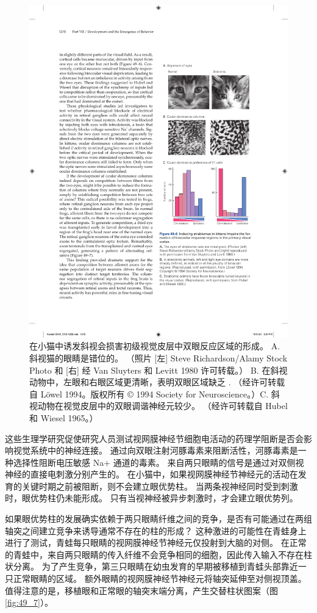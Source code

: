 \begin{figure}[htbp]
	\centering
	\includegraphics[width=0.5\linewidth]{chap49/fig_49_6}
	\caption{在小猫中诱发斜视会损害初级视觉皮层中双眼反应区域的形成。 A. 斜视猫的眼睛是错位的。 （照片 [左] Steve Richardson/Alamy Stock Photo 和 [右] 经 Van Sluyters 和 Levitt 1980 许可转载。） B. 在斜视动物中，左眼和右眼区域更清晰，表明双眼区域缺乏 . （经许可转载自 Löwel 1994。版权所有 © 1994 Society for Neuroscience。）C. 斜视动物在视觉皮层中的双眼调谐神经元较少。 （经许可转载自 Hubel 和 Wiesel 1965。）}
	\label{fig:49_6}
\end{figure}

这些生理学研究促使研究人员测试视网膜神经节细胞电活动的药理学阻断是否会影响视觉系统中的神经连接。 通过向双眼注射河豚毒素来阻断活性，河豚毒素是一种选择性阻断电压敏感 Na+ 通道的毒素。 来自两只眼睛的信号是通过对双侧视神经的直接电刺激分别产生的。 在小猫中，如果视网膜神经节神经元的活动在发育的关键时期之前被阻断，则不会建立眼优势柱。 当两条视神经同时受到刺激时，眼优势柱仍未能形成。 只有当视神经被异步刺激时，才会建立眼优势列。

如果眼优势柱的发展确实依赖于两只眼睛纤维之间的竞争，是否有可能通过在两组轴突之间建立竞争来诱导通常不存在的柱的形成？ 这种激进的可能性在青蛙身上进行了测试，青蛙每只眼睛的视网膜神经节神经元仅投射到大脑的对侧。 在正常的青蛙中，来自两只眼睛的传入纤维不会竞争相同的细胞，因此传入输入不存在柱状分离。 为了产生竞争，第三只眼睛在幼虫发育的早期被移植到青蛙头部靠近一只正常眼睛的区域。 额外眼睛的视网膜神经节神经元将轴突延伸至对侧视顶盖。 
值得注意的是，移植眼和正常眼的轴突末端分离，产生交替柱状图案（图 \ref{fig:49_7}）。

